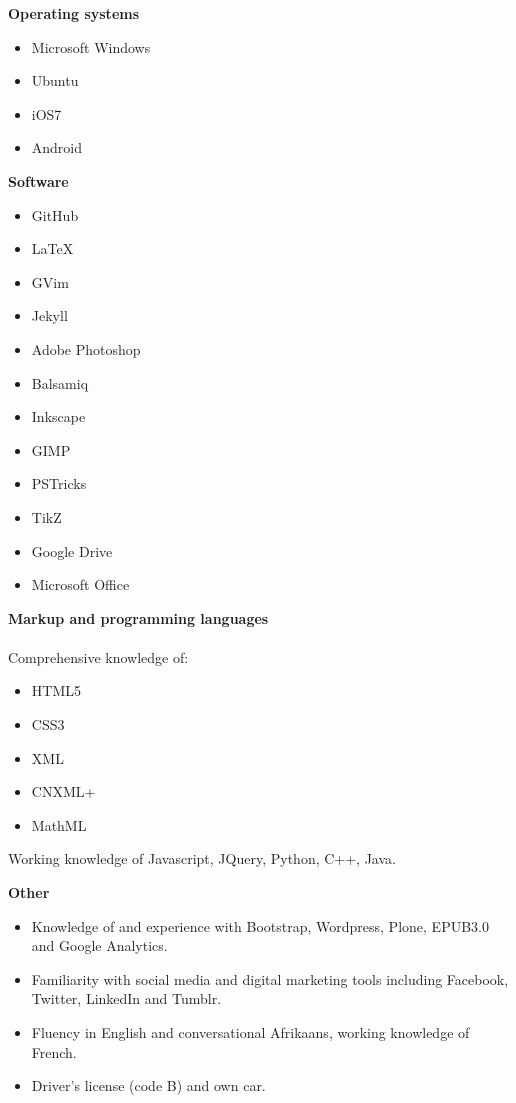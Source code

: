 \documentclass[]{friggeri-cv} %
\begin{document}
\textbf{Operating systems}
\begin{multicols}{2}
\begin{itemize}
 \item Microsoft Windows
 \item Ubuntu
 \item iOS7
 \item Android
\end{itemize}
\end{multicols}

\textbf{Software}
\begin{multicols}{2}
\begin{itemize}
 \item GitHub
 \item LaTeX
 \item GVim
 \item Jekyll
  \item Adobe Photoshop
 \item Balsamiq
 \item Inkscape
 \item GIMP
 \item PSTricks
 \item TikZ
 \item Google Drive
 \item Microsoft Office
\end{itemize}
\end{multicols}

\textbf{Markup and programming languages}\\
\\
Comprehensive knowledge of: 
\begin{itemize}
 \item HTML5
 \item CSS3
 \item XML
 \item CNXML+
 \item MathML
 \end{itemize}
Working knowledge of Javascript, JQuery, Python, C++, Java.

\textbf{Other}
\begin{itemize}
\item Knowledge of and experience with Bootstrap, Wordpress, Plone, EPUB3.0 and Google Analytics.
 \item Familiarity with social media and digital marketing tools including Facebook, Twitter, LinkedIn and Tumblr.
 \item Fluency in English and conversational Afrikaans, working knowledge of French.
 \item Driver's license (code B) and own car.
\end{itemize}
\end{document}
